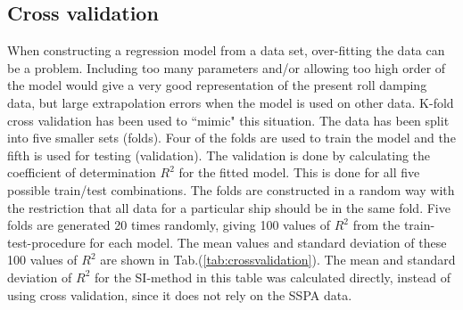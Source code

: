 \subsection{Cross validation}
\label{se:cross_validation}
When constructing a regression model from a data set, over-fitting the data can be a problem. Including too many parameters and/or allowing too high order of the model would give a very good representation of the present roll damping data, but large extrapolation errors when the model is used on other data. K-fold cross validation has been used to ``mimic" this situation. The data has been split into five smaller sets (folds). Four of the folds are used to train the model and the fifth is used for testing (validation). The validation is done by calculating the coefficient of determination $R^2$ for the fitted model. This is done for all five possible train/test combinations. 
The folds are constructed in a random way with the restriction that all data for a particular ship should be in the same fold. Five folds are generated 20 times randomly, giving 100 values of $R^2$ from the train-test-procedure for each model. The mean values and standard deviation of these 100 values of $R^2$ are shown in Tab.(\ref{tab:crossvalidation}). The mean and standard deviation of $R^2$ for the SI-method in this table was calculated directly, instead of using cross validation, since it does not rely on the SSPA data.



